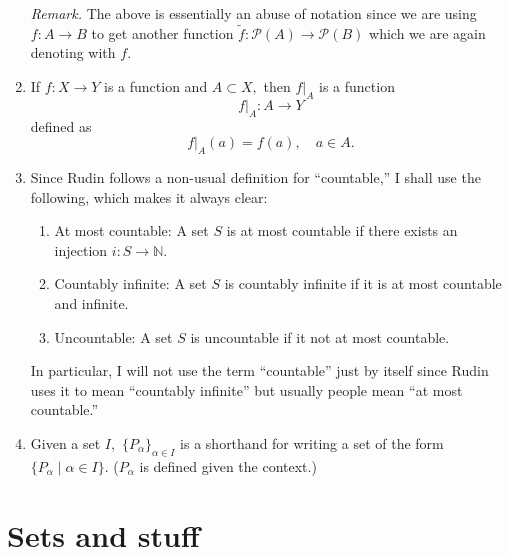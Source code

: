 \documentclass[12pt]{article}
\theoremstyle{definition}
\numberwithin{thm}{section}
\begin{document}
\begin{enumerate}
	\emph{Remark.} The above is essentially an abuse of notation since we are using $f:A \to B$ to get another function $\tilde{f}:\mathcal{P}(A) \to \mathcal{P}(B)$ which we are again denoting with $f.$ 
	\item \label{funcrestrict} If $f:X \to Y$ is a function and $A \subset X,$ then $f|_A$ is a function
	\begin{equation*} 
		f|_A : A \to Y
	\end{equation*}
	defined as
	\begin{equation*} 
		f|_A(a) = f(a), \quad a \in A.
	\end{equation*}
	\item Since Rudin follows a non-usual definition for ``countable,'' I shall use the following, which makes it always clear:
	\begin{enumerate}
		\item At most countable: A set $S$ is at most countable if there exists an injection $i : S \to \mathbb{N}.$
		\item Countably infinite: A set $S$ is countably infinite if it is at most countable and infinite.
		\item Uncountable: A set $S$ is uncountable if it not at most countable.
	\end{enumerate}
	In particular, I will not use the term ``countable'' just by itself since Rudin uses it to mean ``countably infinite'' but usually people mean ``at most countable.''
	\item Given a set $I,$ $\{P_\alpha\}_{\alpha \in I}$ is a shorthand for writing a set of the form $\{P_\alpha \mid \alpha \in I\}.$ ($P_\alpha$ is defined given the context.)
\end{enumerate}
\newpage\section{Sets and stuff}\label{sec:sets}
\end{document}

